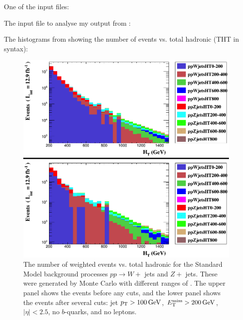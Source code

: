 One of the \madgraph input files:



The \madanalysis input file to analyse my output from \madgraph:



The histograms from \madanalysis showing the number of events vs. total hadronic \HT (THT in \madanalysis syntax):

\begin{figure}[H]
\centering
\includegraphics[width=\textwidth]{./sec15/HT_HTranges.png}
\caption{The number of weighted events vs. total hadronic \HT for the Standard Model background processes $pp \rightarrow W +$ jets and $Z +$ jets. These were generated by Monte Carlo with different ranges of \HT. The upper panel shows the events before any cuts, and the lower panel shows the events after several cuts: jet $p_{\mathrm{T}} > 100\,\text{G\text{e\kern-0.15ex V}}$, $E_{\mathrm{T}}^{\text{miss}} > 200\,\text{G\text{e\kern-0.15ex V}}$, $|\eta| < 2.5$, no $b$-quarks, and no leptons.}
\end{figure}

